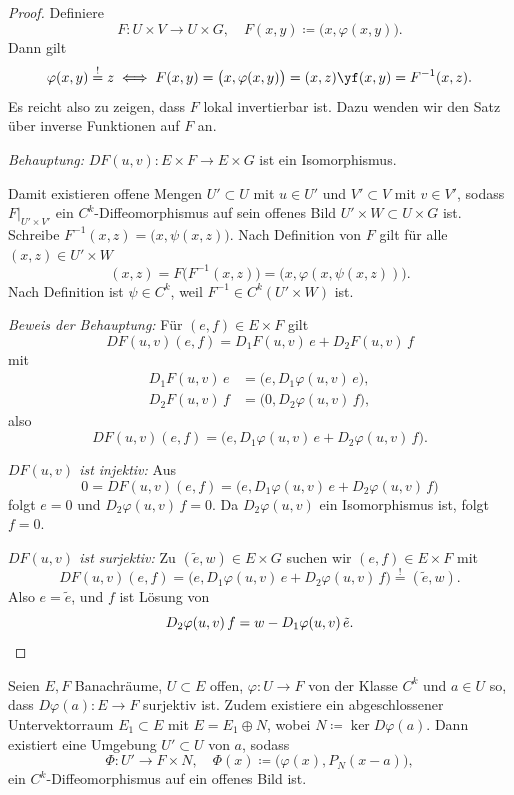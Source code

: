 \documentclass[11pt]{article}
\begin{document}
\begin{proof}
  Definiere
  \[ F\colon U \times V \to U \times G, \quad F(x, y) \coloneqq \bigl(x, \varphi(x, y)\bigr). \]
  Dann gilt
  \[
    \varphi(x, y) \overset{!}{=} z
    \iff F(x, y) = \bigl(x, \varphi(x, y)\bigr) = (x, z)
    \yf (x, y) = F^{-1}(x, z).
  \]
  Es reicht also zu zeigen, dass $F$ lokal invertierbar ist. Dazu wenden wir den Satz über inverse Funktionen auf $F$ an.


  \textit{Behauptung:} $DF(u, v)\colon E \times F \to E \times G$ ist ein Isomorphismus.

  Damit existieren offene Mengen $U' \subset U$ mit $u \in U'$ und $V' \subset V$ mit $v \in V'$, sodass $F|_{U' \times V'}$ ein $C^k$-Diffeomorphismus auf sein offenes Bild $U' \times W \subset U \times G$ ist.
Schreibe $F^{-1}(x, z) = \bigl(x, \psi(x, z)\bigr)$.
Nach Definition von $F$ gilt für alle $(x, z) \in U' \times W$
  \[ (x, z) = F\bigl(F^{-1}(x, z)\bigr) = \bigl(x, \varphi(x, \psi(x, z))\bigr). \]
  Nach Definition ist $\psi \in C^k$, weil $F^{-1} \in C^k(U' \times W)$ ist.

  \textit{Beweis der Behauptung:} Für $(e, f) \in E \times F$ gilt
  \[ DF(u, v)(e, f) = D_1 F(u, v)\, e + D_2 F(u, v)\, f \]
  mit
  \begin{align*}
    D_1 F(u, v)\, e &= \bigl(e, D_1 \varphi(u, v)\, e\bigr), \\
    D_2 F(u, v)\, f &= \bigl(0, D_2 \varphi(u, v)\, f\bigr),
  \end{align*}
  also
  \[ DF(u, v)(e, f) = \bigl(e, D_1 \varphi(u, v)\, e + D_2 \varphi(u, v)\, f\bigr). \]


  \textit{$DF(u, v)$ ist injektiv:} Aus
  \[ 0 = DF(u, v)(e, f) = \bigl(e, D_1 \varphi(u, v)\, e + D_2 \varphi(u, v)\, f\bigr) \]
  folgt $e = 0$ und $D_2 \varphi(u, v)\, f = 0$. Da $D_2 \varphi(u, v)$ ein Isomorphismus ist, folgt $f = 0$.


  \textit{$DF(u, v)$ ist surjektiv:} Zu $(\tilde{e}, w) \in E \times G$ suchen wir $(e, f) \in E \times F$ mit
  \[ DF(u, v)(e, f) = \bigl(e, D_1 \varphi(u, v)\, e + D_2 \varphi(u, v)\, f\bigr) \overset{!}{=} (\tilde{e}, w). \]
  Also $e = \tilde{e}$, und $f$ ist Lösung von
  \[ D_2 \varphi(u, v)\, f = w - D_1 \varphi(u, v)\, \tilde{e}. \qedhere \]
\end{proof}

\begin{theorem}\Theorem
  Seien $E, F$ Banachräume, $U \subset E$ offen, $\varphi\colon U \to F$ von der Klasse $C^k$ und $a \in U$ so, dass $D\varphi(a)\colon E \to F$ surjektiv ist.
  Zudem existiere ein abgeschlossener Untervektorraum $E_1 \subset E$ mit $E = E_1 \oplus N$, wobei $N \coloneqq \ker D\varphi(a)$.
  Dann existiert eine Umgebung $U' \subset U$ von $a$, sodass
  \[ \Phi\colon U' \to F \times N, \quad \Phi(x) \coloneqq \bigl(\varphi(x), P_N(x - a)\bigr), \]
  ein $C^k$-Diffeomorphismus auf ein offenes Bild ist.
\end{theorem}
\end{document}
